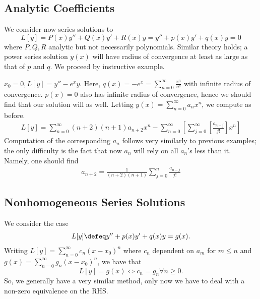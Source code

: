 \subsection{Analytic Coefficients}
We consider now series solutions to \[
L[y] = P(x)y'' + Q(x)y' + R(x) y = y'' + p(x)y' + q(x)y = 0
\]
where $P, Q, R$ analytic but not necessarily polynomials. Similar theory holds; a power series solution $y(x)$ will have radius of convergence at least as large as that of $p$ and $q$. We proceed by instructive example.
\begin{example}
    $x_0 = 0, L[y] = y'' - e^x y$. Here, $q(x) = -e^{x} = \sum_{n=0}^\infty \frac{x^n}{n!}$ with infinite radius of convergence. $p(x) = 0$ also has infinite radius of convergence, hence we should find that our solution will as well. Letting $y(x) = \sum_{n=0}^\infty a_n x^n$, we compute as before.
    \begin{align*}
        L[y] = \sum_{n=0}^\infty (n+2)(n+1)a_{n+2}x^n - \sum_{n=0}^\infty\left[\sum_{j=0}^\infty [\frac{a_{n-j}}{j!}]x^n\right]
    \end{align*}
    Computation of the corresponding $a_n$ follows very similarly to previous examples; the only difficulty is the fact that now $a_n$ will rely on all $a_n$'s less than it. Namely, one should find \begin{align*}
        a_{n+2} = \frac{1}{(n+2)(n+1)} \sum_{j=0}^n \frac{a_{n-j}}{j!}
    \end{align*}
\end{example}

\subsection{Nonhomogeneous Series Solutions}

We consider the case \begin{align*}
    L[y] \defeq y'' + p(x) y' + q(x) y = g(x).
\end{align*}
Writing $L[y]  = \sum_{n=0}^\infty c_n (x - x_0)^n$ where $c_n$ dependent on $a_m$ for $m \leq n$ and $g(x) = \sum_{n=0}^\infty g_n (x-x_0)^n$, we have that \[
L[y] = g(x)  \iff c_n = g_n \forall n \geq 0. 
\]
So, we generally have a very similar method, only now we have to deal with a non-zero equivalence on the RHS.

